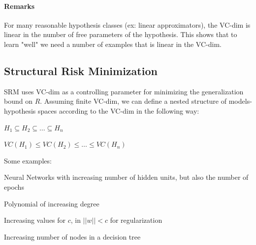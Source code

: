 \documentclass[10pt]{report}
\begin{document}
\paragraph{Remarks} For many reasonable hypothesis classes (ex: linear approximators), the VC-dim is linear in the number of free parameters of the hypothesis. This shows that to learn "well" we need a number of examples that is linear in the VC-dim.
\subsection{Structural Risk Minimization} SRM uses VC-dim as a controlling parameter for minimizing the generalization bound on $R$. Assuming finite VC-dim, we can define a nested structure of models-hypothesis spaces according to the VC-dim in the following way:\begin{list}{}{}
	\item $H_1\subseteq H_2\subseteq \ldots\subseteq H_n$
	\item $VC(H_1)\leq VC(H_2)\leq \ldots\leq VC(H_n)$
\end{list}
Some examples:
\begin{list}{}{}
	\item Neural Networks with increasing number of hidden units, but also the number of epochs
	\item Polynomial of increasing degree
	\item Increasing values for $c$, in $||w||<c$ for regularization
	\item Increasing number of nodes in a decision tree
\end{list}
\end{document}
